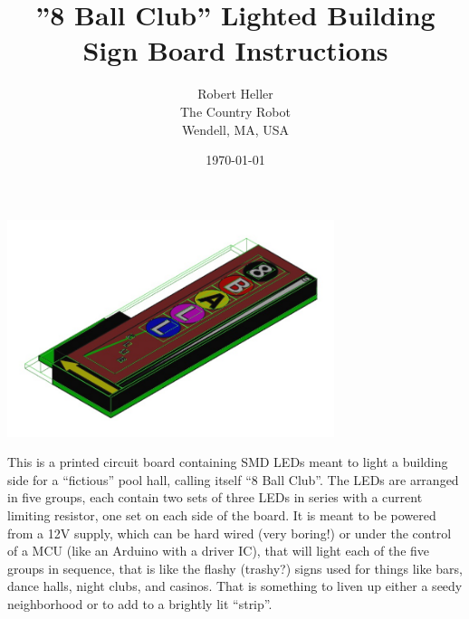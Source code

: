 \documentclass[12pt,twoside]{article}
\title{''8 Ball Club'' Lighted Building Sign Board Instructions}
\author{Robert Heller \\ The Country Robot \\ Wendell, MA, USA}
\date{\today}
\begin{document}
\maketitle

\begin{centering}\includegraphics[height=2.5in]{8BallSign-ISOMetric.png}\\\end{centering}

This is a printed circuit board containing SMD LEDs meant to light a building 
side for a ``fictious'' pool hall, calling itself ``8 Ball Club''. The LEDs 
are arranged in five groups, each contain two sets of three LEDs in series 
with a current limiting resistor, one set on each side of the board.  It is 
meant to be powered from a 12V supply, which can be hard wired (very boring!) 
or under the control of a MCU (like an Arduino with a driver IC), that will 
light each of the five groups in sequence, that is like the flashy (trashy?) 
signs used for things like bars, dance halls, night clubs, and casinos. That 
is something to liven up either a seedy neighborhood or to add to a brightly 
lit ``strip''.
\end{document}

